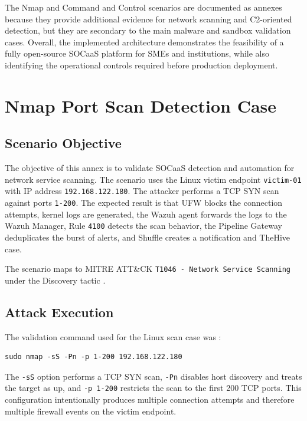 The Nmap and Command and Control scenarios are documented as annexes because they provide additional evidence for network scanning and C2-oriented detection, but they are secondary to the main malware and sandbox validation cases. Overall, the implemented architecture demonstrates the feasibility of a fully open-source SOCaaS platform for SMEs and institutions, while also identifying the operational controls required before production deployment.

\appendix

\chapter{Nmap Port Scan Detection Case}
\label{chap:nmap-port-scan-detection-case}

\section{Scenario Objective}
\label{sec:annex-a-scenario-objective}

The objective of this annex is to validate SOCaaS detection and automation for network service scanning. The scenario uses the Linux victim endpoint \texttt{victim-01} with IP address \texttt{192.168.122.180}. The attacker performs a TCP SYN scan against ports \texttt{1-200}. The expected result is that UFW blocks the connection attempts, kernel logs are generated, the Wazuh agent forwards the logs to the Wazuh Manager, Rule \texttt{4100} detects the scan behavior, the Pipeline Gateway deduplicates the burst of alerts, and Shuffle creates a notification and TheHive case.

The scenario maps to MITRE ATT\&CK \texttt{T1046 - Network Service Scanning} under the Discovery tactic \cite{ch4-mitre-t1046}.

\section{Attack Execution}
\label{sec:annex-a-attack-execution}

The validation command used for the Linux scan case was \cite{ch4-nmap-docs}:

\begin{verbatim}
sudo nmap -sS -Pn -p 1-200 192.168.122.180
\end{verbatim}

The \texttt{-sS} option performs a TCP SYN scan, \texttt{-Pn} disables host discovery and treats the target as up, and \texttt{-p 1-200} restricts the scan to the first 200 TCP ports. This configuration intentionally produces multiple connection attempts and therefore multiple firewall events on the victim endpoint.

